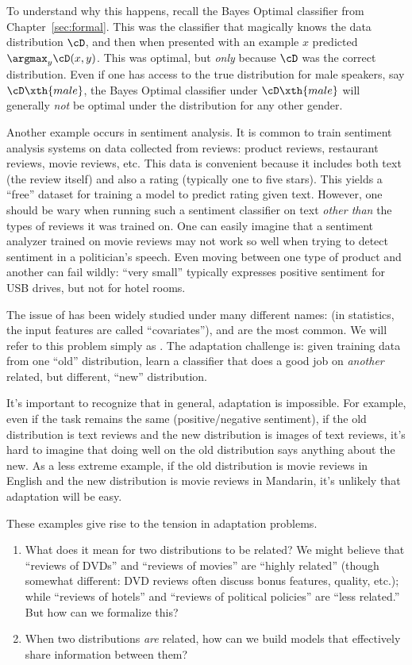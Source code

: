 To understand why this happens, recall the Bayes Optimal classifier from Chapter~\ref{sec:formal}. This was the classifier that magically knows the data distribution $\cD$, and then when presented with an example $x$ predicted $\argmax_y \cD(x,y)$. This was optimal, but \emph{only} because $\cD$ was the correct distribution. Even if one has access to the true distribution for male speakers, say $\cD\xth{male}$, the Bayes Optimal classifier under $\cD\xth{male}$ will generally \emph{not} be optimal under the distribution for any other gender.

Another example occurs in sentiment analysis.
It is common to train sentiment analysis systems on data collected from reviews: product reviews, restaurant reviews, movie reviews, etc.
This data is convenient because it includes both text (the review itself) and also a rating (typically one to five stars).
This yields a ``free'' dataset for training a model to predict rating given text.
However, one should be wary when running such a sentiment classifier on text \emph{other than} the types of reviews it was trained on.
One can easily imagine that a sentiment analyzer trained on movie reviews may not work so well when trying to detect sentiment in a politician's speech.
Even moving between one type of product and another can fail wildly: ``very small'' typically expresses positive sentiment for USB drives, but not for hotel rooms.

The issue of  has been widely studied under many different names:  (in statistics, the input features are called ``covariates''),  and  are the most common. We will refer to this problem simply as . The adaptation challenge is: given training data from one ``old'' distribution, learn a classifier that does a good job on \emph{another} related, but different, ``new'' distribution.

It's important to recognize that in general, adaptation is impossible.
For example, even if the task remains the same (positive/negative sentiment), if the old distribution is text reviews and the new distribution is images of text reviews, it's hard to imagine that doing well on the old distribution says anything about the new.
As a less extreme example, if the old distribution is movie reviews in English and the new distribution is movie reviews in Mandarin, it's unlikely that adaptation will be easy.

These examples give rise to the tension in adaptation problems.
\begin{enumerate}
\item What does it mean for two distributions to be related?
We might believe that ``reviews of DVDs'' and ``reviews of movies'' are ``highly related'' (though somewhat different: DVD reviews often discuss bonus features, quality, etc.); while ``reviews of hotels'' and ``reviews of political policies'' are ``less related.''
But how can we formalize this?
\item When two distributions \emph{are} related, how can we build models that effectively share information between them?
\end{enumerate}


